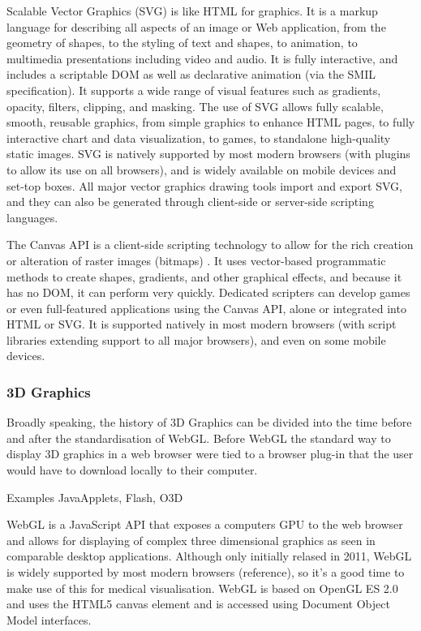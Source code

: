 \documentclass[a4paper,11pt,titlepage]{article}
\begin{document}
Scalable Vector Graphics (SVG) is like HTML for graphics. It is a markup language for describing all aspects of an image or Web application, from the geometry of shapes, to the styling of text and shapes, to animation, to multimedia presentations including video and audio. It is fully interactive, and includes a scriptable DOM as well as declarative animation (via the SMIL specification). It supports a wide range of visual features such as gradients, opacity, filters, clipping, and masking.
The use of SVG allows fully scalable, smooth, reusable graphics, from simple graphics to enhance HTML pages, to fully interactive chart and data visualization, to games, to standalone high-quality static images. SVG is natively supported by most modern browsers (with plugins to allow its use on all browsers), and is widely available on mobile devices and set-top boxes. All major vector graphics drawing tools import and export SVG, and they can also be generated through client-side or server-side scripting languages.

The Canvas API is a client-side scripting technology to allow for the rich creation or alteration of raster images (bitmaps) . It uses vector-based programmatic methods to create shapes, gradients, and other graphical effects, and because it has no DOM, it can perform very quickly. Dedicated scripters can develop games or even full-featured applications using the Canvas API, alone or integrated into HTML or SVG. It is supported natively in most modern browsers (with script libraries extending support to all major browsers), and even on some mobile devices.

\subsubsection{3D Graphics}

Broadly speaking, the history of 3D Graphics can be divided into the time before and after the standardisation of WebGL. Before WebGL the standard way to display 3D graphics in a web browser were tied to a browser plug-in that the user would have to download locally to their computer.

Examples JavaApplets, Flash, O3D

WebGL is a JavaScript API that exposes a computers GPU to the web browser and allows for displaying of complex three dimensional graphics as seen in comparable desktop applications. Although only initially relased in 2011, WebGL is widely supported by most modern browsers (reference), so it's a good time to make use of this for medical visualisation. WebGL is based on OpenGL ES 2.0 and uses the HTML5 canvas element and is accessed using Document Object Model interfaces.
\end{document}
